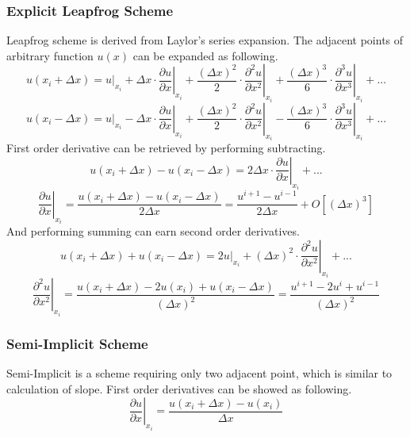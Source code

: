 \subsubsection{Explicit Leapfrog Scheme}
Leapfrog scheme is derived from Laylor's series expansion. The adjacent points of arbitrary function $u(x)$ can be
expanded as following.
\begin{equation}
  u(x_i+\Delta x) = u|_{x_i} + 
  \Delta x\cdot\left.\frac{\partial u}{\partial x}\right|_{x_i} + 
  \frac{(\Delta x)^2}{2}\cdot\left.\frac{\partial ^2 u}{\partial x^2}\right|_{x_i} + 
  \frac{(\Delta x)^3}{6}\cdot\left.\frac{\partial ^3 u}{\partial x^3}\right|_{x_i} + ...
\end{equation}
\begin{equation}
  u(x_i-\Delta x) = u|_{x_i} -
  \Delta x\cdot\left.\frac{\partial u}{\partial x}\right|_{x_i} + 
  \frac{(\Delta x)^2}{2}\cdot\left.\frac{\partial ^2 u}{\partial x^2}\right|_{x_i} -
  \frac{(\Delta x)^3}{6}\cdot\left.\frac{\partial ^3 u}{\partial x^3}\right|_{x_i} + ...
\end{equation}
First order derivative can be retrieved by performing subtracting.
\begin{equation}
  u(x_i+\Delta x) - u(x_i-\Delta x) = 2\Delta x\cdot\left.\frac{\partial u}{\partial x}\right|_{x_i}+...
\end{equation}
\begin{equation}
  \left.\frac{\partial u}{\partial x}\right|_{x_i} = \frac{u(x_i+\Delta x) - u(x_i-\Delta x)}{2\Delta x} = \frac{u^{i+1} - u^{i-1}}{2\Delta x} + O[(\Delta x)^3]
\end{equation}
And performing summing can earn second order derivatives.
\begin{equation}
  u(x_i+\Delta x) + u(x_i-\Delta x) = \left.2u\right|_{x_i} + (\Delta x)^2\cdot\left.\frac{\partial ^2 u}{\partial x^2}\right|_{x_i} + ...
\end{equation}
\begin{equation}
  \left.\frac{\partial^2 u}{\partial x^2}\right|_{x_i} = \frac{u(x_i+\Delta x) - 2u(x_i) + u(x_i-\Delta x)}{(\Delta x)^2} = \frac{u^{i+1} - 2u^i + u^{i-1}}{(\Delta x)^2} %
\end{equation}


\subsubsection{Semi-Implicit Scheme}
Semi-Implicit is a scheme requiring only two adjacent point, which is similar to calculation of slope. First order
derivatives can be showed as following.
\begin{equation}
  \left.\frac{\partial u}{\partial x}\right|_{x_i} = \frac{u(x_i+\Delta x) - u(x_i)}{\Delta x}
\end{equation}





